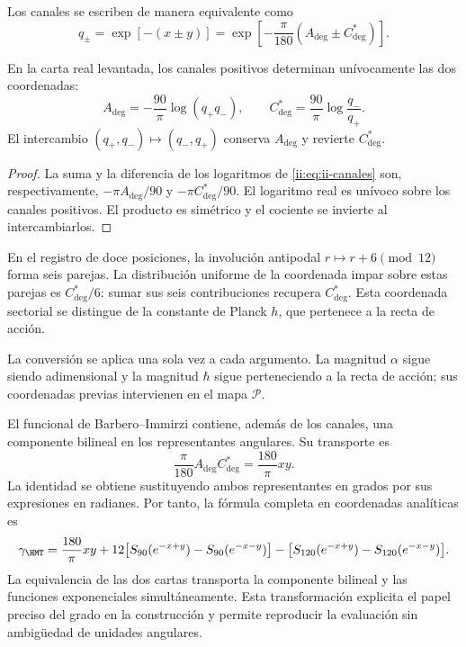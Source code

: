 Los canales se escriben de manera equivalente como
\begin{equation}
 q_\pm=\exp[-(x\pm y)]
 =\exp\!\left[-\frac{\pi}{180}(A_{\deg}\pm C^*_{\deg})\right].
\label{ii:eq:ii-canales}
\end{equation}
\begin{proposition}
\label{ii:prop:ii-inversion-canales-angulares}
En la carta real levantada, los canales positivos determinan
unívocamente las dos coordenadas:
\[
 A_{\deg}=-\frac{90}{\pi}\log(q_+q_-),\qquad
 C^*_{\deg}=\frac{90}{\pi}\log\frac{q_-}{q_+}.
\]
El intercambio \((q_+,q_-)\mapsto(q_-,q_+)\) conserva
\(A_{\deg}\) y revierte \(C^*_{\deg}\).
\end{proposition}
\begin{proof}
La suma y la diferencia de los logaritmos de
\eqref{ii:eq:ii-canales} son, respectivamente,
\(-\pi A_{\deg}/90\) y \(-\pi C^*_{\deg}/90\).
El logaritmo real es unívoco sobre los canales positivos.
El producto es simétrico y el cociente se invierte al intercambiarlos.
\end{proof}
En el registro de doce posiciones, la involución antipodal
\(r\mapsto r+6\pmod {12}\) forma seis parejas. La distribución
uniforme de la coordenada impar sobre estas parejas es
\(C^*_{\deg}/6\): sumar sus seis contribuciones recupera
\(C^*_{\deg}\). Esta coordenada sectorial se distingue de
la constante de Planck \(h\), que pertenece a la recta de acción.

La conversión se aplica una sola vez a cada argumento. La magnitud
\(\alpha\) sigue siendo adimensional y la magnitud \(\hbar\)
sigue perteneciendo a la recta de acción; sus coordenadas previas
intervienen en el mapa \(\mathcal P\).

El funcional de Barbero--Immirzi contiene, además de los canales, una
componente bilineal en los representantes angulares. Su transporte es
\begin{equation}
 \frac{\pi}{180}A_{\deg}C^*_{\deg}
 =\frac{180}{\pi}xy.
 \label{ii:eq:ii-barbero-cartas}
\end{equation}
La identidad se obtiene sustituyendo ambos representantes en grados
por sus expresiones en radianes. Por tanto, la fórmula completa en
coordenadas analíticas es
\[
 \gamma_{\HMT}
 =\frac{180}{\pi}xy
 +12\bigl[S_{90}(e^{-x+y})-S_{90}(e^{-x-y})\bigr]
 -\bigl[S_{120}(e^{-x+y})-S_{120}(e^{-x-y})\bigr].
\]
La equivalencia de las dos cartas transporta la componente bilineal
y las funciones exponenciales simultáneamente. Esta transformación
explicita el papel preciso del grado en la construcción y permite
reproducir la evaluación sin ambigüedad de unidades angulares.
